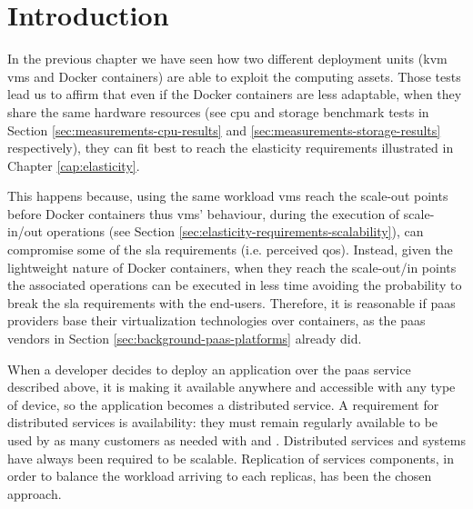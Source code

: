 %
%
\section{Introduction}
\label{sec:architecture-introduction}
In the previous chapter we have seen how two different deployment units (\ac{kvm} \ac{vm}s and Docker
containers) are able to exploit the computing assets. Those tests lead us to affirm that even if
the Docker containers are less adaptable, when they share the same hardware resources (see \acs{cpu}
and storage benchmark tests in Section \ref{sec:measurements-cpu-results} and
\ref{sec:measurements-storage-results} respectively), they can fit best to reach the elasticity
requirements illustrated in Chapter \ref{cap:elasticity}.

This happens because, using the same workload \ac{vm}s reach the scale-out points before Docker
containers thus \ac{vm}s' behaviour, during the execution of scale-in/out operations (see Section
\ref{sec:elasticity-requirements-scalability}), can compromise some of the \ac{sla} requirements
(i.e. perceived \ac{qos}). Instead, given the lightweight nature of Docker containers, when they reach
the scale-out/in points the associated operations can be executed in less time avoiding the probability
to break the \ac{sla} requirements with the end-users. Therefore, it is reasonable if \ac{paas} providers
base their virtualization technologies over containers, as the \ac{paas} vendors in Section
\ref{sec:background-paas-platforms} already did.

When a developer decides to deploy an application over the \ac{paas} service described above, it is
making it available anywhere and accessible with any type of device, so the application becomes a
distributed service. A requirement for distributed services is  availability: they must remain regularly
available to be used by as many customers as needed with  and .
Distributed services and systems have always been required to be scalable. Replication of services components,
in order to balance the workload arriving to each replicas, has been the chosen approach.

